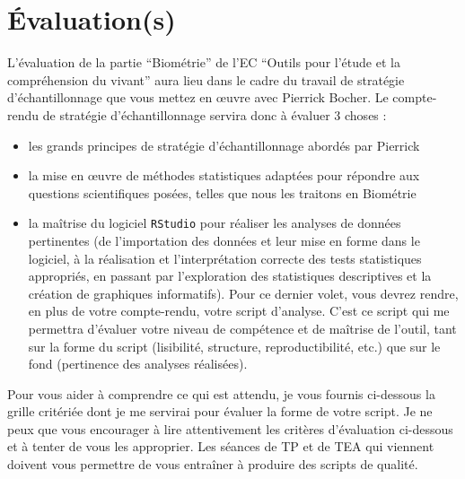 \documentclass[
  a4paper,
  DIV=11,
  numbers=noendperiod,
  oneside]{scrreprt}
\providecommand{\tightlist}{%
  \setlength{\itemsep}{0pt}\setlength{\parskip}{0pt}}\usepackage{longtable,booktabs,array}
\begin{document}
\hypertarget{uxe9valuations}{%
\section*{Évaluation(s)}\label{uxe9valuations}}


L'évaluation de la partie ``Biométrie'' de l'EC ``Outils pour l'étude et
la compréhension du vivant'' aura lieu dans le cadre du travail de
stratégie d'échantillonnage que vous mettez en œuvre avec Pierrick
Bocher. Le compte-rendu de stratégie d'échantillonnage servira donc à
évaluer 3 choses :

\begin{itemize}
\tightlist
\item
  les grands principes de stratégie d'échantillonnage abordés par
  Pierrick
\item
  la mise en œuvre de méthodes statistiques adaptées pour répondre aux
  questions scientifiques posées, telles que nous les traitons en
  Biométrie
\item
  la maîtrise du logiciel \texttt{RStudio} pour réaliser les analyses de
  données pertinentes (de l'importation des données et leur mise en
  forme dans le logiciel, à la réalisation et l'interprétation correcte
  des tests statistiques appropriés, en passant par l'exploration des
  statistiques descriptives et la création de graphiques informatifs).
  Pour ce dernier volet, vous devrez rendre, en plus de votre
  compte-rendu, votre script d'analyse. C'est ce script qui me permettra
  d'évaluer votre niveau de compétence et de maîtrise de l'outil, tant
  sur la forme du script (lisibilité, structure, reproductibilité, etc.)
  que sur le fond (pertinence des analyses réalisées).
\end{itemize}

Pour vous aider à comprendre ce qui est attendu, je vous fournis
ci-dessous la grille critériée dont je me servirai pour évaluer la forme
de votre script. Je ne peux que vous encourager à lire attentivement les
critères d'évaluation ci-dessous et à tenter de vous les approprier. Les
séances de TP et de TEA qui viennent doivent vous permettre de vous
entraîner à produire des scripts de qualité.
\end{document}
